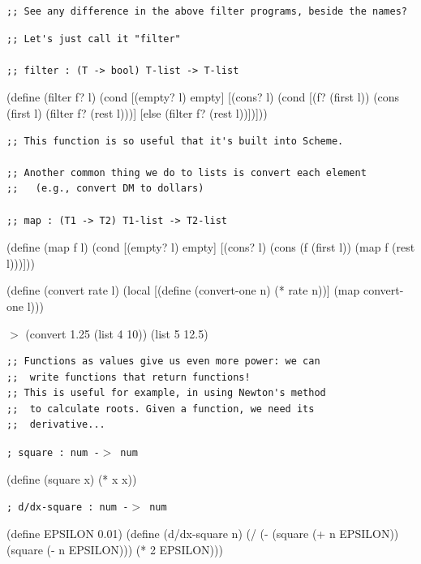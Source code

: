 \documentclass{article}
\begin{document}
\begin{verbatim}
;; See any difference in the above filter programs, beside the names?
\end{verbatim}

\newpage

\begin{verbatim}
;; Let's just call it "filter"

;; filter : (T -> bool) T-list -> T-list
\end{verbatim}

\begin{schemedisplay}
(define (filter f? l)
  (cond
    [(empty? l) empty]
    [(cons? l)
     (cond
       [(f? (first l))
        (cons (first l) (filter f? (rest l)))]
       [else
        (filter f? (rest l))])]))
\end{schemedisplay}

\begin{verbatim}
;; This function is so useful that it's built into Scheme.

;; Another common thing we do to lists is convert each element
;;   (e.g., convert DM to dollars)

;; map : (T1 -> T2) T1-list -> T2-list
\end{verbatim}

\begin{schemedisplay}
(define (map f l)
  (cond
    [(empty? l) empty]
    [(cons? l) (cons (f (first l))
                     (map f (rest l)))]))

(define (convert rate l)
  (local [(define (convert-one n)
            (* rate n))]
     (map convert-one l)))

$>$ (convert 1.25 (list 4 10))
(list 5 12.5)
\end{schemedisplay}

\begin{verbatim}
;; Functions as values give us even more power: we can
;;  write functions that return functions!
;; This is useful for example, in using Newton's method
;;  to calculate roots. Given a function, we need its
;;  derivative...
\end{verbatim}

\newpage

{\tt ; square : num -$>$ num }
\begin{schemedisplay}
(define (square x)
  (* x x))
\end{schemedisplay}

{\tt ; d/dx-square : num -$>$ num}
\begin{schemedisplay}
(define EPSILON 0.01)
(define (d/dx-square n)
  (/ (- (square (+ n EPSILON)) (square (- n EPSILON)))
     (* 2 EPSILON)))
\end{schemedisplay}
\end{document}

